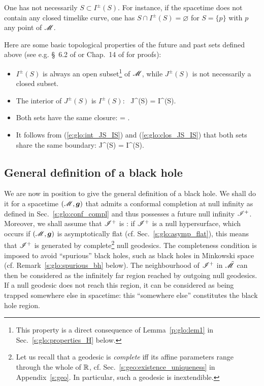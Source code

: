 \begin{remark}
One has not necessarily $S \subset I^\pm(S)$. For instance,
if the spacetime does not contain
any closed timelike curve, one has  $S \cap I^\pm(S) = \varnothing$ for
$S = \{p\}$ with $p$ any point of $\mathscr{M}$.
\end{remark}

Here are some basic topological properties of the future and past sets
defined above (see e.g. \S~6.2 of \cite{HawkiE73} or Chap.~14 of
\cite{ONeil83} for proofs):
\begin{itemize}
\item
$I^\pm(S)$ is always an open subset\footnote{This property is a direct
consequence of Lemma~\ref{p:glo:lem1} in Sec.~\ref{s:glo:properties_H} below.} of $\mathscr{M}$, while
$J^\pm(S)$ is not necessarily a closed subset.
\item The interior of $J^\pm(S)$ is $I^\pm(S)$:
\be \label{e:glo:int_JS_IS}
    \, J^\pm(S) = I^\pm(S).
\ee
\item Both sets have the same closure:
\be \label{e:glo:clos_JS_IS}
     =  .
\ee
\item
It follows from (\ref{e:glo:int_JS_IS}) and (\ref{e:glo:clos_JS_IS})
that both sets share the same boundary:
\be \label{e:glo:boundary_JS_IS}
    \partial J^\pm(S) = \partial I^\pm(S).
\ee
\end{itemize}

\subsection{General definition of a black hole} \label{s:glo:def_BH}

We are now in position to give the general definition of a black hole.
We shall do it for a spacetime $(\mathscr{M},\bm{g})$ that admits a conformal completion
at null infinity as defined in Sec.~\ref{s:glo:conf_compl} and thus
possesses a future null infinity $\mathscr{I}^+$.
Moreover, we shall assume that $\mathscr{I}^+$ is : if $\mathscr{I}^+$
is a null hypersurface, which occurs if $(\mathscr{M},\bm{g})$ is asymptotically flat
(cf. Sec.~\ref{s:glo:asymp_flat}),
this means that $\mathscr{I}^+$ is generated by complete\footnote{Let us recall
that a geodesic is \emph{complete} iff its affine parameters range through the whole of
$\mathbb{R}$, cf. Sec.~\ref{s:geo:existence_uniqueness}
in Appendix~\ref{s:geo}. In particular, such a geodesic is inextendible.}
null geodesics.
The completeness condition is imposed to avoid ``spurious'' black holes,
such as black holes in Minkowski space (cf. Remark~\ref{s:glo:spurious_bh} below).
The neighbourhood of $\mathscr{I}^+$
in $\tilde{\mathscr{M}}$ can then be considered as the infinitely far region
reached by outgoing null geodesics. If a null geodesic does not reach this
region, it can be considered as being trapped somewhere else in spacetime: this
``somewhere else'' constitutes the black hole region.

